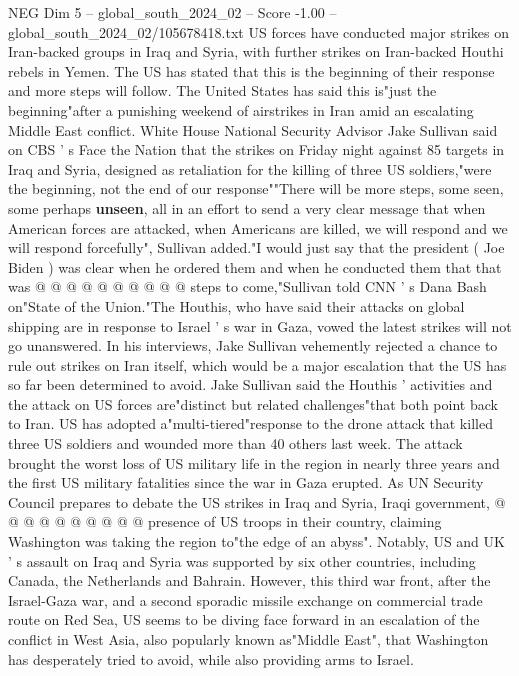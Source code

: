 \begin{textsample}{NEG Dim 5 – global\_south\_2024\_02 – Score -1.00 – global\_south\_2024\_02/105678418.txt}  \label{ex:f5_neg_304}
US forces have conducted major strikes on Iran-backed groups in Iraq and Syria, with further strikes on Iran-backed Houthi rebels in Yemen.
The US has stated that this is the beginning of their response and more steps will follow.
The United States has said this is"just the beginning"after a punishing weekend of airstrikes in Iran amid an escalating Middle East conflict.
White House National Security Advisor Jake Sullivan said on CBS ' s Face the Nation that the strikes on Friday night against 85 targets in Iraq and Syria, designed as retaliation for the killing of three US soldiers,"were the beginning, not the end of our response""There will be more steps, some seen, some perhaps \textbf{unseen}, all in an effort to send a very clear message that when American forces are attacked, when Americans are killed, we will respond and we will respond forcefully", Sullivan added."I would just say that the president ( Joe Biden ) was clear when he ordered them and when he conducted them that that was @ @ @ @ @ @ @ @ @ @ steps to come,"Sullivan told CNN ' s Dana Bash on"State of the Union."The Houthis, who have said their attacks on global shipping are in response to Israel ' s war in Gaza, vowed the latest strikes will not go unanswered.
In his interviews, Jake Sullivan vehemently rejected a chance to rule out strikes on Iran itself, which would be a major escalation that the US has so far been determined to avoid.
Jake Sullivan said the Houthis ' activities and the attack on US forces are"distinct but related challenges"that both point back to Iran.
US has adopted a"multi-tiered"response to the drone attack that killed three US soldiers and wounded more than 40 others last week.
The attack brought the worst loss of US military life in the region in nearly three years and the first US military fatalities since the war in Gaza erupted.
As UN Security Council prepares to debate the US strikes in Iraq and Syria, Iraqi government, @ @ @ @ @ @ @ @ @ @ presence of US troops in their country, claiming Washington was taking the region to"the edge of an abyss".
Notably, US and UK ' s assault on Iraq and Syria was supported by six other countries, including Canada, the Netherlands and Bahrain.
However, this third war front, after the Israel-Gaza war, and a second sporadic missile exchange on commercial trade route on Red Sea, US seems to be diving face forward in an escalation of the conflict in West Asia, also popularly known as"Middle East", that Washington has desperately tried to avoid, while also providing arms to Israel.

\end{textsample}
